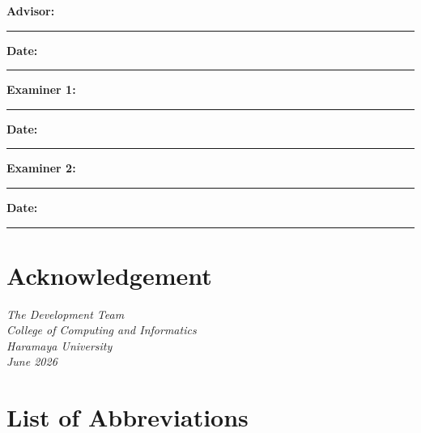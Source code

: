\documentclass[12pt, a4paper]{article}
\begin{document}
\vspace{2cm}
\textbf{Advisor:} \rule{6cm}{0.4pt} \hspace{1cm} \textbf{Date:} \rule{4cm}{0.4pt}
\vspace{2cm}

\textbf{Examiner 1:} \rule{6cm}{0.4pt} \hspace{1cm} \textbf{Date:} \rule{4cm}{0.4pt}
\vspace{1cm}

\textbf{Examiner 2:} \rule{6cm}{0.4pt} \hspace{1cm} \textbf{Date:} \rule{4cm}{0.4pt}
\newpage

\newpage
\thispagestyle{plain}
\section*{Acknowledgement}



\vspace{2cm}
\begin{flushright}
\textit{The Development Team}\\
\textit{College of Computing and Informatics}\\
\textit{Haramaya University}\\
\textit{June 2026}
\end{flushright}

\newpage
\section*{List of Abbreviations}
\end{document}
